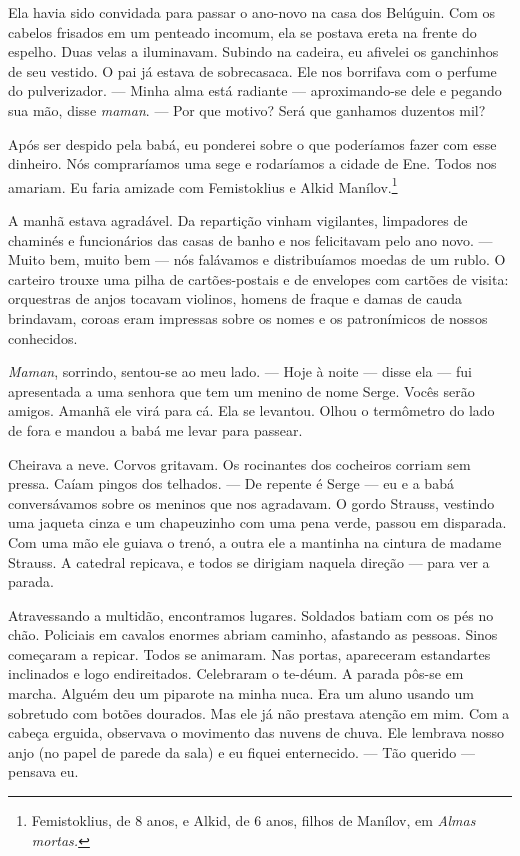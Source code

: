Ela havia sido convidada para passar o ano-novo na casa dos Belúguin.
Com os cabelos frisados em um penteado incomum, ela se postava ereta na
frente do espelho. Duas velas a iluminavam. Subindo na cadeira, eu
afivelei os ganchinhos de seu vestido. O pai já estava de sobrecasaca.
Ele nos borrifava com o perfume do pulverizador. --- Minha alma está
radiante --- aproximando-se dele e pegando sua mão, disse \emph{maman}.
--- Por que motivo? Será que ganhamos duzentos mil?

Após ser despido pela babá, eu ponderei sobre o que poderíamos fazer com
esse dinheiro. Nós compraríamos uma sege e rodaríamos a cidade de Ene.
Todos nos amariam. Eu faria amizade com Femistoklius e Alkid
Manílov.\footnote{Femistoklius, de 8 anos, e Alkid, de 6 anos, filhos de
  Manílov, em \emph{Almas mortas. }}

A manhã estava agradável. Da repartição vinham vigilantes, limpadores de
chaminés e funcionários das casas de banho e nos felicitavam pelo ano
novo. --- Muito bem, muito bem --- nós falávamos e distribuíamos moedas
de um rublo. O carteiro trouxe uma pilha de cartões-postais e de
envelopes com cartões de visita: orquestras de anjos tocavam violinos,
homens de fraque e damas de cauda brindavam, coroas eram impressas sobre
os nomes e os patronímicos de nossos conhecidos.

\emph{Maman}, sorrindo, sentou-se ao meu lado. --- Hoje à noite ---
disse ela --- fui apresentada a uma senhora que tem um menino de nome
Serge. Vocês serão amigos. Amanhã ele virá para cá. Ela se levantou.
Olhou o termômetro do lado de fora e mandou a babá me levar para
passear.

Cheirava a neve. Corvos gritavam. Os rocinantes dos cocheiros corriam
sem pressa. Caíam pingos dos telhados. --- De repente é Serge --- eu e a
babá conversávamos sobre os meninos que nos agradavam. O gordo Strauss,
vestindo uma jaqueta cinza e um chapeuzinho com uma pena verde, passou
em disparada. Com uma mão ele guiava o trenó, a outra ele a mantinha na
cintura de madame Strauss. A catedral repicava, e todos se dirigiam
naquela direção --- para ver a parada.

Atravessando a multidão, encontramos lugares. Soldados batiam com os pés
no chão. Policiais em cavalos enormes abriam caminho, afastando as
pessoas. Sinos começaram a repicar. Todos se animaram. Nas portas,
apareceram estandartes inclinados e logo endireitados. Celebraram o
te-déum. A parada pôs-se em marcha. Alguém deu um piparote na minha
nuca. Era um aluno usando um sobretudo com botões dourados. Mas ele já
não prestava atenção em mim. Com a cabeça erguida, observava o movimento
das nuvens de chuva. Ele lembrava nosso anjo (no papel de parede da
sala) e eu fiquei enternecido. --- Tão querido --- pensava eu.

